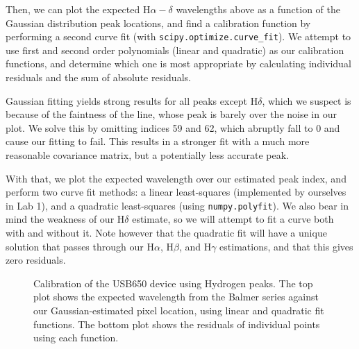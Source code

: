\documentclass[twocolumn]{aastex702}
\begin{document}
			Then, we can plot the expected H$\alpha-\delta$ wavelengths above as a function of the Gaussian distribution peak locations, and find a calibration function by performing a second curve fit (with \texttt{scipy.optimize.curve\_fit}). We attempt to use first and second order polynomials (linear and quadratic) as our calibration functions, and determine which one is most appropriate by calculating individual residuals and the sum of absolute residuals.
		
			Gaussian fitting yields strong results for all peaks except H$\delta$, which we suspect is because of the faintness of the line, whose peak is barely over the noise in our plot. We solve this by omitting indices 59 and 62, which abruptly fall to 0 and cause our fitting to fail. This results in a stronger fit with a much more reasonable covariance matrix, but a potentially less accurate peak. %
			
			
			With that, we plot the expected wavelength over our estimated peak index, and perform two curve fit methods: a linear least-squares (implemented by ourselves in Lab 1), and a quadratic least-squares (using \texttt{numpy.polyfit}). We also bear in mind the weakness of our H$\delta$ estimate, so we will attempt to fit a curve both with and without it. Note however that the quadratic fit will have a unique solution that passes through our H$\alpha$, H$\beta$, and H$\gamma$ estimations, and that this gives zero residuals.
						
			\begin{figure}
				\caption{Calibration of the USB650 device using Hydrogen peaks. The top plot shows the expected wavelength from the Balmer series against our Gaussian-estimated pixel location, using linear and quadratic fit functions. The bottom plot shows the residuals of individual points using each function.}
				\label{fig:31-H-residuals}
			\end{figure}
			
\end{document}
